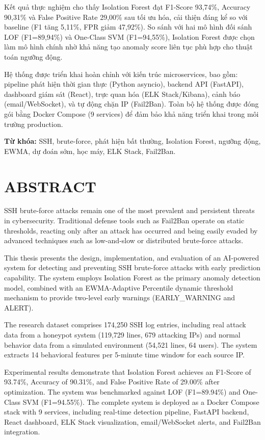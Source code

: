 \documentclass[13pt,a4paper,oneside]{report}
\begin{document}
Kết quả thực nghiệm cho thấy Isolation Forest đạt F1-Score 93,74\%, Accuracy 90,31\% và False Positive Rate 29,00\% sau tối ưu hóa, cải thiện đáng kể so với baseline (F1 tăng 5,11\%, FPR giảm 47,92\%). So sánh với hai mô hình đối sánh LOF (F1=89,94\%) và One-Class SVM (F1=94,55\%), Isolation Forest được chọn làm mô hình chính nhờ khả năng tạo anomaly score liên tục phù hợp cho thuật toán ngưỡng động.

Hệ thống được triển khai hoàn chỉnh với kiến trúc microservices, bao gồm: pipeline phát hiện thời gian thực (Python asyncio), backend API (FastAPI), dashboard giám sát (React), trực quan hóa (ELK Stack/Kibana), cảnh báo (email/WebSocket), và tự động chặn IP (Fail2Ban). Toàn bộ hệ thống được đóng gói bằng Docker Compose (9 services) để đảm bảo khả năng triển khai trong môi trường production.

\vspace{0.5cm}
\noindent\textbf{Từ khóa:} SSH, brute-force, phát hiện bất thường, Isolation Forest, ngưỡng động, EWMA, dự đoán sớm, học máy, ELK Stack, Fail2Ban.

\chapter*{ABSTRACT}

SSH brute-force attacks remain one of the most prevalent and persistent threats in cybersecurity. Traditional defense tools such as Fail2Ban operate on static thresholds, reacting only after an attack has occurred and being easily evaded by advanced techniques such as low-and-slow or distributed brute-force attacks.

This thesis presents the design, implementation, and evaluation of an AI-powered system for detecting and preventing SSH brute-force attacks with early prediction capability. The system employs Isolation Forest as the primary anomaly detection model, combined with an EWMA-Adaptive Percentile dynamic threshold mechanism to provide two-level early warnings (EARLY\_WARNING and ALERT).

The research dataset comprises 174,250 SSH log entries, including real attack data from a honeypot system (119,729 lines, 679 attacking IPs) and normal behavior data from a simulated environment (54,521 lines, 64 users). The system extracts 14 behavioral features per 5-minute time window for each source IP.

Experimental results demonstrate that Isolation Forest achieves an F1-Score of 93.74\%, Accuracy of 90.31\%, and False Positive Rate of 29.00\% after optimization. The system was benchmarked against LOF (F1=89.94\%) and One-Class SVM (F1=94.55\%). The complete system is deployed as a Docker Compose stack with 9 services, including real-time detection pipeline, FastAPI backend, React dashboard, ELK Stack visualization, email/WebSocket alerts, and Fail2Ban integration.
\end{document}
